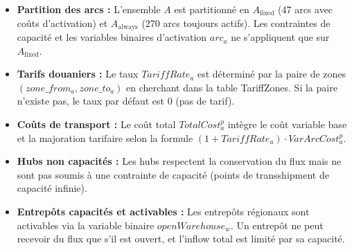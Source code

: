 \documentclass{article}
\begin{document}
\begin{itemize}
    \item \textbf{Partition des arcs :} L'ensemble $A$ est partitionné en $A_{\text{fixed}}$ (47 arcs avec coûts
    d'activation) et $A_{\text{always}}$ (270 arcs toujours actifs). Les contraintes de capacité et les variables
    binaires d'activation $arc_a$ ne s'appliquent que sur $A_{\text{fixed}}$.

    \item \textbf{Tarifs douaniers :} Le taux $TariffRate_a$ est déterminé par la paire de zones
    $(zone\_from_a, zone\_to_a)$ en cherchant dans la table TariffZones. Si la paire n'existe pas,
    le taux par défaut est 0 (pas de tarif).

    \item \textbf{Coûts de transport :} Le coût total $TotalCost_a^p$ intègre le coût variable base et
    la majoration tarifaire selon la formule $(1 + TariffRate_a) \cdot VarArcCost_a^p$.

    \item \textbf{Hubs non capacités :} Les hubs respectent la conservation du flux mais ne sont pas
    soumis à une contrainte de capacité (points de transshipment de capacité infinie).

    \item \textbf{Entrepôts capacités et activables :} Les entrepôts régionaux sont activables via
    la variable binaire $openWarehouse_w$. Un entrepôt ne peut recevoir du flux que s'il est ouvert,
    et l'inflow total est limité par sa capacité.

\end{itemize}
\end{document}
